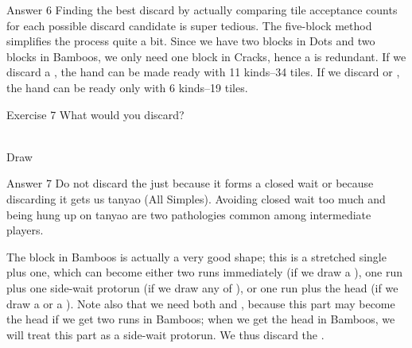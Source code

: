 \newpage

\begin{itembox}[r]{Answer 6}
\emj
Finding the best discard by actually comparing tile acceptance counts for each possible discard candidate is super tedious. The five-block method simplifies the process quite a bit. Since we have two blocks in Dots and two blocks in Bamboos, we only need one block in Cracks, hence a {\large{}} is redundant. If we discard a {\large{}}, the hand can be made ready with 11 kinds--34 tiles. If we discard {\large{} } or {\large{}}, the hand can be ready only with 6 kinds--19 tiles. 
\end{itembox}

\vfill

\begin{itembox}[l]{Exercise 7}
What would you discard? 
\vspace{-10pt}

\bp
{}~\\
\hspace{290pt}\footnotesize{Draw}
\ep
\end{itembox}

\newpage


\begin{itembox}[r]{Answer 7}
\emj
Do not discard the {\large{}} just because it forms a closed wait or because discarding it gets us {\jap tanyao} (All Simples). Avoiding closed wait too much and being hung up on {\jap tanyao} are two pathologies common among intermediate players. 
\bigskip

The block in Bamboos is actually a very good shape; this is a stretched single plus one, which can become either two runs immediately (if we draw a {\large{}}), one run plus one side-wait protorun (if we draw any of {\large{}}), or one run plus the head (if we draw a {\large{}} or a {\large{}}). Note also that we need both {\large{}} and {\large{}}, because this part may become the head if we get two runs in Bamboos; when we get the head in Bamboos, we will treat this part as a side-wait protorun. We thus discard the {\large{}}. 
\end{itembox}


